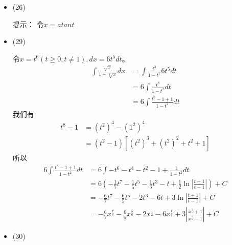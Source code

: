 \documentclass{article}
\begin{document}
\begin{itemize}
  \item (26)

        提示： 令$x = a tan t$

  \item (29)

        令$x = t^6 (t \geq 0, t \neq 1), dx = 6t^5 dt$。
        \begin{align*}
          \int \frac{\sqrt{x}}{1 - \sqrt[3]{x}} dx
           & = \int \frac{t^3}{1 - t^2} 6 t^5 dt     \\
           & = 6 \int \frac{t^8}{1 - t^2} dt         \\
           & = 6 \int \frac{t^8 - 1 + 1}{1 - t^2} dt
        \end{align*}
        我们有
        \begin{align*}
          t^8 - 1 & = (t^2)^4 - (1^2)^4                       \\
                  & = (t^2 - 1) [(t^2)^3 + (t^2)^2 + t^2 + 1]
        \end{align*}
        所以
        \begin{align*}
          6 \int \frac{t^8 - 1 + 1}{1 - t^2} dt
           & = 6 \int -t^6 - t^4 - t^2 - 1 + \frac{1}{1 - t^2} dt                                                                                                                       \\
           & = 6 \left(-\frac{1}{7} t^7 - \frac{1}{5} t^5 - \frac{1}{3} t^3 - t + \frac{1}{2}\ln \left|\frac{t + 1}{t - 1}\right|\right) + C                                            \\
           & = - \frac{6}{7} t^7 - \frac{6}{5} t^5 - 2 t^3 - 6t + 3\ln \left|\frac{t + 1}{t - 1}\right| + C                                                                             \\
           & = - \frac{6}{7} x^{\frac{7}{6}} - \frac{6}{5} x^{\frac{5}{6}} - 2 x^{\frac{1}{2}} - 6 x^{\frac{1}{6}} + 3 \left|\frac{x^{\frac{1}{6}} + 1}{x^{\frac{1}{6}} - 1}\right| + C
        \end{align*}

  \item (30)


\end{itemize}
\end{document}
